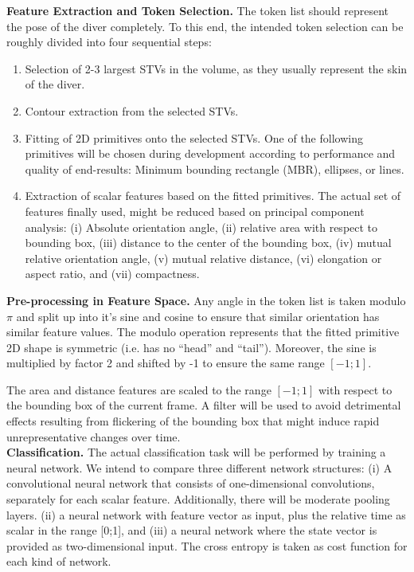 \documentclass[10pt]{article}
\begin{document}
\textbf{Feature Extraction and Token Selection.} The token list should represent the pose of the diver completely. To this end, the intended token selection can be roughly divided into four sequential steps:
\begin{enumerate}[nosep]
\item Selection of 2-3 largest STVs in the volume, as they usually represent the skin of the diver.
\item Contour extraction from the selected STVs.
\item Fitting of 2D primitives onto the selected STVs. One of the following primitives will be chosen during development according to performance and quality of end-results: Minimum bounding rectangle (MBR), ellipses, or lines.
\item Extraction of scalar features based on the fitted primitives. The actual set of features finally used, might be reduced based on principal component analysis: (i) Absolute orientation angle, (ii) relative area with respect to bounding box, (iii) distance to the center of the bounding box, (iv) mutual relative orientation angle, (v) mutual relative distance, (vi) elongation or aspect ratio, and (vii) compactness.
\end{enumerate}
\vspace{1em}
\hspace{\parindent}\textbf{Pre-processing in Feature Space.} Any angle in the token list is taken modulo $\pi$ and split up into it's sine and cosine to ensure that similar orientation has similar feature values. The modulo operation represents that the fitted primitive 2D shape is symmetric (i.e. has no ``head'' and ``tail''). Moreover, the sine is multiplied by factor 2 and shifted by -1 to ensure the same range $[-1;1]$.

The area and distance features are scaled to the range $[-1;1]$ with respect to the bounding box of the current frame. A filter will be used to avoid detrimental effects resulting from flickering of the bounding box that might induce rapid unrepresentative changes over time.\\

\textbf{Classification.} The actual classification task will be performed by training a neural network. We intend to compare three different network structures: (i) A convolutional neural network that consists of one-dimensional convolutions, separately for each scalar feature. Additionally, there will be moderate pooling layers. (ii) a neural network with feature vector as input, plus the relative time as scalar in the range [0;1], and (iii) a neural network where the state vector is provided as two-dimensional input. The cross entropy is taken as cost function for each kind of network.
\end{document}
